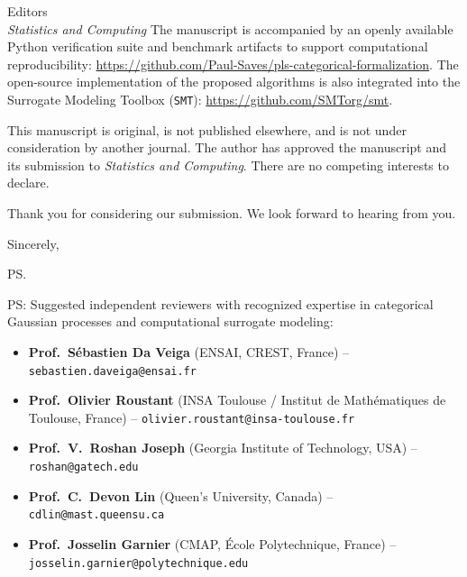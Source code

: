 \documentclass[11pt]{letter}
\begin{document}
\begin{letter}{Editors\\
\textit{Statistics and Computing}}
The manuscript is accompanied by an openly available Python verification suite and benchmark artifacts to support computational reproducibility:
\url{https://github.com/Paul-Saves/pls-categorical-formalization}.
The open-source implementation of the proposed algorithms is also integrated into the Surrogate Modeling Toolbox (\texttt{SMT}):
\url{https://github.com/SMTorg/smt}.

This manuscript is original, is not published elsewhere, and is not under consideration by another journal. The author has approved the manuscript and its submission to \textit{Statistics and Computing}. There are no competing interests to declare.

Thank you for considering our submission. We look forward to hearing from you.

\closing{Sincerely,}

\ps{PS: Suggested independent reviewers with recognized expertise in categorical Gaussian processes and computational surrogate modeling:
\begin{itemize}
    \item \textbf{Prof.~S\'ebastien Da Veiga} (ENSAI, CREST, France) -- \texttt{sebastien.daveiga@ensai.fr}
    \item \textbf{Prof.~Olivier Roustant} (INSA Toulouse / Institut de Math\'ematiques de Toulouse, France) -- \texttt{olivier.roustant@insa-toulouse.fr}
    \item \textbf{Prof.~V.~Roshan Joseph} (Georgia Institute of Technology, USA) -- \texttt{roshan@gatech.edu}
    \item \textbf{Prof.~C.~Devon Lin} (Queen's University, Canada) -- \texttt{cdlin@mast.queensu.ca}
    \item \textbf{Prof.~Josselin Garnier} (CMAP, \'Ecole Polytechnique, France) -- \texttt{josselin.garnier@polytechnique.edu}
\end{itemize}}

\end{letter}
\end{document}
